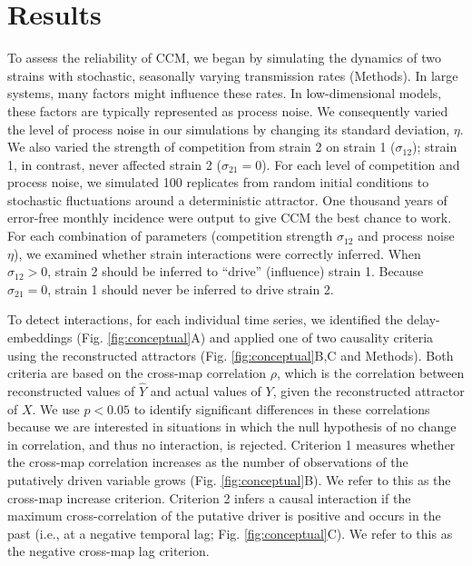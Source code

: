 \documentclass[10pt,letterpaper]{article}
\begin{document}
\section*{Results}

To assess the reliability of CCM, we began by simulating the dynamics of two strains with stochastic, seasonally varying transmission rates (Methods).
In large systems, many factors might influence these rates.
In low-dimensional models, these factors are typically represented as process noise.
We consequently varied the level of process noise in our simulations by changing its standard deviation, $\eta$.
We also varied the strength of competition from strain 2 on strain 1 ($\sigma_{12}$); strain 1, in contrast, never affected strain 2 ($\sigma_{21}=0$).
For each level of competition and process noise, we simulated 100 replicates from random initial conditions to stochastic fluctuations around a deterministic attractor.
One thousand years of error-free monthly incidence were output to give CCM the best chance to work.
For each combination of parameters (competition strength $\sigma_{12}$ and process noise $\eta$), we examined whether strain interactions were correctly inferred.
When $\sigma_{12} >0$, strain 2 should be inferred to ``drive'' (influence) strain 1. 
Because $\sigma_{21}=0$, strain 1 should never be inferred to drive strain 2. 

To detect interactions, for each individual time series, we identified the delay-embeddings (Fig. \ref{fig:conceptual}A) and applied one of two causality criteria using the reconstructed attractors (Fig. \ref{fig:conceptual}B,C and Methods). 
Both criteria are based on the cross-map correlation $\rho$, which is the correlation between reconstructed values of $\hat{Y}$ and actual values of $Y$, given the reconstructed attractor of $X$.
We use $p < 0.05$ to identify significant differences in these correlations because we are interested in situations in which the null hypothesis of no change in correlation, and thus no interaction, is rejected.
Criterion 1 \cite{Sugihara2012, Clark2015} measures whether the cross-map correlation increases as the number of observations of the putatively driven variable grows (Fig. \ref{fig:conceptual}B).
We refer to this as the cross-map increase criterion.
Criterion 2 \cite{Ye2015} infers a causal interaction if the maximum cross-correlation of the putative driver is positive and occurs in the past (i.e., at a negative temporal lag; Fig. \ref{fig:conceptual}C).
We refer to this as the negative cross-map lag criterion.
\end{document}
